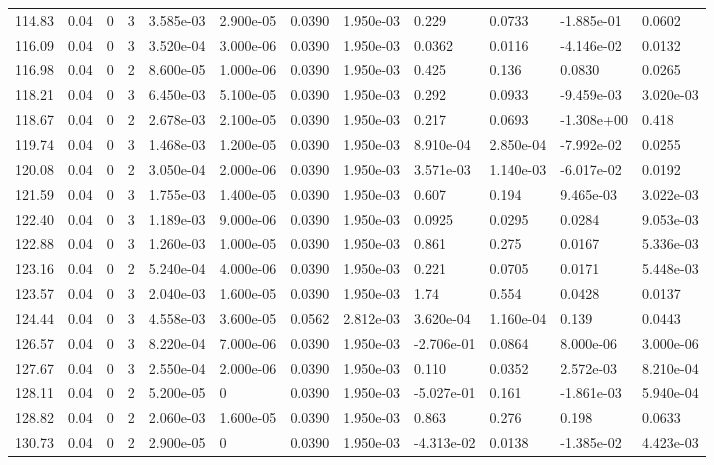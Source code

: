 \documentclass[preview]{standalone}
\begin{document}
{{{{{\begin{tabular}{L{1.2cm}C{1.2cm} C{0.3cm}C{0.5cm} C{1.4cm}C{1.4cm} C{1.4cm}C{1.4cm} C{1.6cm}C{1.6cm} C{1.6cm}C{1.6cm}}
  114.83  &  0.04  & 0     &  3 &  3.585e-03  & 2.900e-05  &  0.0390&   1.950e-03& 0.229 & 0.0733   &  -1.885e-01 & 0.0602  \\ 
  116.09  &  0.04  & 0     &  3 &  3.520e-04  & 3.000e-06  &  0.0390&   1.950e-03& 0.0362 & 0.0116   &  -4.146e-02 & 0.0132  \\ 
  116.98  &  0.04  & 0     &  2 &  8.600e-05  & 1.000e-06  &  0.0390&   1.950e-03& 0.425 & 0.136   &  0.0830 & 0.0265  \\ 
  118.21  &  0.04  & 0     &  3 &  6.450e-03  & 5.100e-05  &  0.0390&   1.950e-03& 0.292 & 0.0933   &  -9.459e-03 & 3.020e-03  \\ 
  118.67  &  0.04  & 0     &  2 &  2.678e-03  & 2.100e-05  &  0.0390&   1.950e-03& 0.217 & 0.0693   &  -1.308e+00 & 0.418  \\ 
  119.74  &  0.04  & 0     &  3 &  1.468e-03  & 1.200e-05  &  0.0390&   1.950e-03& 8.910e-04 & 2.850e-04   &  -7.992e-02 & 0.0255  \\ 
  120.08  &  0.04  & 0     &  2 &  3.050e-04  & 2.000e-06  &  0.0390&   1.950e-03& 3.571e-03 & 1.140e-03   &  -6.017e-02 & 0.0192  \\ 
  121.59  &  0.04  & 0     &  3 &  1.755e-03  & 1.400e-05  &  0.0390&   1.950e-03& 0.607 & 0.194   &  9.465e-03 & 3.022e-03  \\ 
  122.40  &  0.04  & 0     &  3 &  1.189e-03  & 9.000e-06  &  0.0390&   1.950e-03& 0.0925 & 0.0295   &  0.0284 & 9.053e-03  \\ 
  122.88  &  0.04  & 0     &  3 &  1.260e-03  & 1.000e-05  &  0.0390&   1.950e-03& 0.861 & 0.275   &  0.0167 & 5.336e-03  \\ 
  123.16  &  0.04  & 0     &  2 &  5.240e-04  & 4.000e-06  &  0.0390&   1.950e-03& 0.221 & 0.0705   &  0.0171 & 5.448e-03  \\ 
  123.57  &  0.04  & 0     &  3 &  2.040e-03  & 1.600e-05  &  0.0390&   1.950e-03& 1.74 & 0.554   &  0.0428 & 0.0137  \\ 
  124.44  &  0.04  & 0     &  3 &  4.558e-03  & 3.600e-05  &  0.0562&   2.812e-03& 3.620e-04 & 1.160e-04   &  0.139 & 0.0443  \\ 
  126.57  &  0.04  & 0     &  3 &  8.220e-04  & 7.000e-06  &  0.0390&   1.950e-03& -2.706e-01 & 0.0864   &  8.000e-06 & 3.000e-06  \\ 
  127.67  &  0.04  & 0     &  3 &  2.550e-04  & 2.000e-06  &  0.0390&   1.950e-03& 0.110 & 0.0352   &  2.572e-03 & 8.210e-04  \\ 
  128.11  &  0.04  & 0     &  2 &  5.200e-05  & 0  &  0.0390&   1.950e-03& -5.027e-01 & 0.161   &  -1.861e-03 & 5.940e-04  \\ 
  128.82  &  0.04  & 0     &  2 &  2.060e-03  & 1.600e-05  &  0.0390&   1.950e-03& 0.863 & 0.276   &  0.198 & 0.0633  \\ 
  130.73  &  0.04  & 0     &  2 &  2.900e-05  & 0  &  0.0390&   1.950e-03& -4.313e-02 & 0.0138   &  -1.385e-02 & 4.423e-03  \\ 
\hline 
\end{tabular} 

}}}}}
\end{document}
